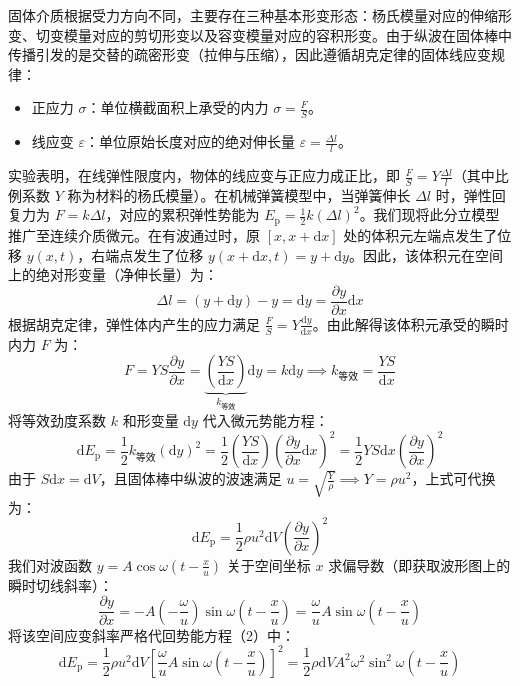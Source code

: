 \begin{definition}[体积元的弹性势能推导]
固体介质根据受力方向不同，主要存在三种基本形变形态：杨氏模量对应的伸缩形变、切变模量对应的剪切形变以及容变模量对应的容积形变。由于纵波在固体棒中传播引发的是交替的疏密形变（拉伸与压缩），因此遵循胡克定律的固体线应变规律：
\begin{itemize}
\item 正应力 $\sigma$：单位横截面积上承受的内力 $\sigma = \frac{F}{S}$。
\item 线应变 $\varepsilon$：单位原始长度对应的绝对伸长量 $\varepsilon = \frac{\Delta l}{l}$。
\end{itemize}
实验表明，在线弹性限度内，物体的线应变与正应力成正比，即 $\frac{F}{S} = Y \frac{\Delta l}{l}$（其中比例系数 $Y$ 称为材料的杨氏模量）。在机械弹簧模型中，当弹簧伸长 $\Delta l$ 时，弹性回复力为 $F = k\Delta l$，对应的累积弹性势能为 $E_{\text{p}} = \frac{1}{2}k(\Delta l)^2$。我们现将此分立模型推广至连续介质微元。在有波通过时，原 $[x, x+\mathrm{d}x]$ 处的体积元左端点发生了位移 $y(x,t)$，右端点发生了位移 $y(x+\mathrm{d}x, t) = y + \mathrm{d}y$。因此，该体积元在空间上的绝对形变量（净伸长量）为：$$\Delta l = (y + \mathrm{d}y) - y = \mathrm{d}y = \frac{\partial y}{\partial x}\mathrm{d}x$$根据胡克定律，弹性体内产生的应力满足 $\frac{F}{S} = Y \frac{\mathrm{d}y}{\mathrm{d}x}$。由此解得该体积元承受的瞬时内力 $F$ 为：$$F = Y S \frac{\partial y}{\partial x} = \underbrace{\left( \frac{YS}{\mathrm{d}x} \right)}_{k_{\text{等效}}} \mathrm{d}y = k \mathrm{d}y \implies k_{\text{等效}} = \frac{YS}{\mathrm{d}x}$$将等效劲度系数 $k$ 和形变量 $\mathrm{d}y$ 代入微元势能方程：$$\mathrm{d}E_{\text{p}} = \frac{1}{2} k_{\text{等效}} (\mathrm{d}y)^2 = \frac{1}{2} \left( \frac{YS}{\mathrm{d}x} \right) \left( \frac{\partial y}{\partial x} \mathrm{d}x \right)^2 = \frac{1}{2} Y S \mathrm{d}x \left( \frac{\partial y}{\partial x} \right)^2$$由于 $S\mathrm{d}x = \mathrm{d}V$，且固体棒中纵波的波速满足 $u = \sqrt{\frac{Y}{\rho}} \implies Y = \rho u^2$，上式可代换为：$$\mathrm{d}E_{\text{p}} = \frac{1}{2} \rho u^2 \mathrm{d}V \left( \frac{\partial y}{\partial x} \right)^2 $$我们对波函数 $y = A \cos \omega \left( t - \frac{x}{u} \right)$ 关于空间坐标 $x$ 求偏导数（即获取波形图上的瞬时切线斜率）：$$\frac{\partial y}{\partial x} = -A \left( -\frac{\omega}{u} \right) \sin \omega \left( t - \frac{x}{u} \right) = \frac{\omega}{u} A \sin \omega \left( t - \frac{x}{u} \right)$$将该空间应变斜率严格代回势能方程（2）中：$$\mathrm{d}E_{\text{p}} = \frac{1}{2} \rho u^2 \mathrm{d}V \left[ \frac{\omega}{u} A \sin \omega \left( t - \frac{x}{u} \right) \right]^2= \frac{1}{2} \rho \mathrm{d}V A^2 \omega^2 \sin^2 \omega \left( t - \frac{x}{u} \right)$$
\end{definition}
